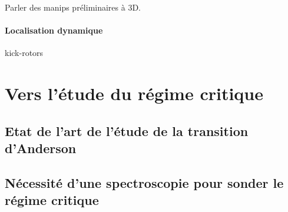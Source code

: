 Parler des manips préliminaires à 3D. 



\paragraph*{Localisation dynamique}
kick-rotors










\section{Vers l'étude du régime critique}
\subsection{Etat de l'art de l'étude de la transition d'Anderson}
\lipsum[6]
\subsection{Nécessité d'une spectroscopie pour sonder le régime critique}
\lipsum[7]

